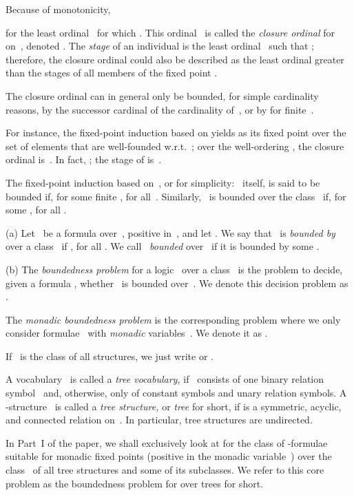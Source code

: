 \documentclass{LMCS}
\begin{document}
Because of monotonicity,

for the least ordinal~ for which
.
This ordinal~ is called the \emph{closure ordinal} for~
on~, denoted .
The \emph{stage} of an individual 
is the least ordinal~ such that \?;
therefore, the closure ordinal could also be described as the least
ordinal greater than the stages of all members of the fixed point .

The closure ordinal can in general only be bounded, for simple
cardinality reasons, by the successor cardinal of the cardinality
of~, or by  for finite~.

For instance, the fixed-point induction based on 
yields as its fixed point over  the set of elements
 that are well-founded w.r.t.\ \?;
over the well-ordering , the closure ordinal is~.
In fact, \?;
the stage of  is~.

The fixed-point induction based on~, or for simplicity\?: ~itself,
is said to be bounded if, for some finite ,
 for all~.
Similarly, ~is bounded
over the class~ if, for some ,
 for all .

\begin{defi}
{\normalfont (a)} Let ~be a formula over~, positive in~,
and let .
We say that ~is \emph{bounded by~} over a class~
if , for all .
We call~ \emph{bounded} over~
if it is bounded by some .

{\normalfont (b)} The \emph{boundedness problem} for a logic~
over a class~ is the problem to decide,
given a formula , whether ~is bounded over~.
We denote this decision problem as .

The \emph{monadic boundedness problem} is
the corresponding problem where we only consider formulae~
with \emph{monadic} variables~.
We denote it as .

If ~is the class of all structures,
we just write  or .
\end{defi}

A vocabulary~ is called a \emph{tree vocabulary,}
if ~consists of one binary relation symbol~
and, otherwise, only of constant symbols and unary relation symbols.
A -structure~ is called a \emph{tree structure,}
or \emph{tree} for short,
if  is a symmetric, acyclic, and connected relation on~.
In particular, tree structures are undirected.

In Part~I of the paper,
we shall exclusively look at 
for the class of -formulae  suitable for
monadic fixed points (positive in the monadic variable~)
over the class~ of all tree structures
and some of its subclasses. We refer to this core problem as
the boundedness problem for  over trees for short.
\end{document}
